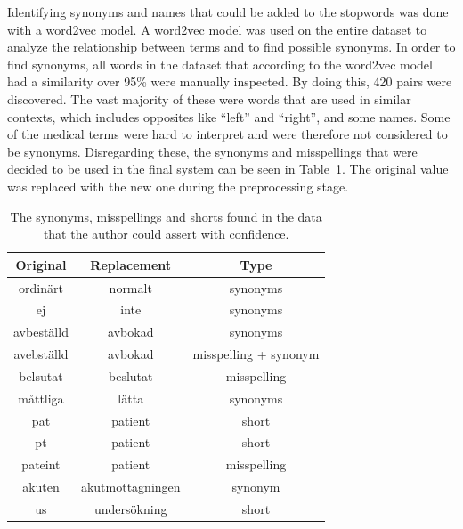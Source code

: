 Identifying synonyms and names that could be added to the stopwords was done with a word2vec model.
A word2vec model was used on the entire dataset to analyze the relationship between terms and to find possible synonyms.
In order to find synonyms, all words in the dataset that according to the word2vec model had a similarity over 95\% were manually inspected.
By doing this, 420 pairs were discovered.
The vast majority of these were words that are used in similar contexts, which includes opposites like ``left'' and ``right'', and some names.
Some of the medical terms were hard to interpret and were therefore not considered to be synonyms.
Disregarding these, the synonyms and misspellings that were decided to be used in the final system can be seen in Table~\ref{tab:synonyms}.
The original value was replaced with the new one during the preprocessing stage.

\begin{table}
    \centering
    \begin{tabular}{|ccc|}
        \hline
        \textbf{Original} & \textbf{Replacement} & \textbf{Type} \\
        \hline
        ordinärt & normalt & synonyms \\
        ej & inte & synonyms \\
        avbeställd & avbokad & synonyms \\
        avebställd & avbokad & misspelling + synonym \\
        belsutat & beslutat & misspelling \\
        måttliga & lätta & synonyms \\
        pat & patient & short \\
        pt & patient & short \\
        pateint & patient & misspelling \\
        akuten & akutmottagningen & synonym \\
        us & undersökning & short \\
        \hline
    \end{tabular}
    \caption{The synonyms, misspellings and shorts found in the data that the author could assert with confidence.}
    \label{tab:synonyms}
\end{table}

